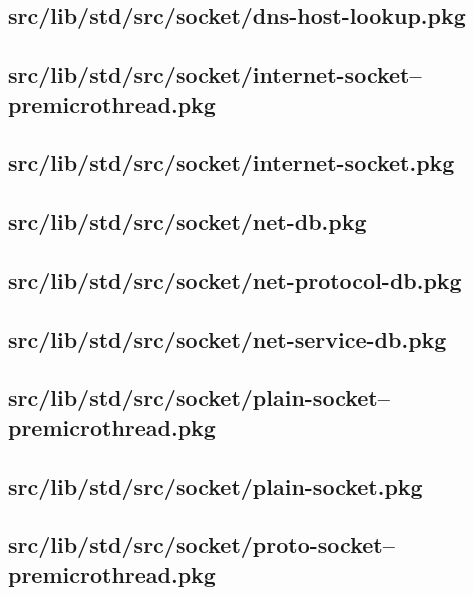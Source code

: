 \subsection{src/lib/std/src/socket/dns-host-lookup.pkg}


\subsection{src/lib/std/src/socket/internet-socket--premicrothread.pkg}


\subsection{src/lib/std/src/socket/internet-socket.pkg}


\subsection{src/lib/std/src/socket/net-db.pkg}


\subsection{src/lib/std/src/socket/net-protocol-db.pkg}


\subsection{src/lib/std/src/socket/net-service-db.pkg}


\subsection{src/lib/std/src/socket/plain-socket--premicrothread.pkg}


\subsection{src/lib/std/src/socket/plain-socket.pkg}


\subsection{src/lib/std/src/socket/proto-socket--premicrothread.pkg}


